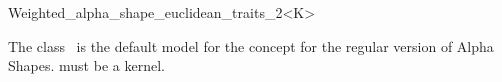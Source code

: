 %
%
%
%
%
%
%
%
%
%
%



\begin{ccRefClass} {Weighted_alpha_shape_euclidean_traits_2<K>}


\ccDefinition

The class \ccRefName\ is the default  model for the concept
 for the regular version of Alpha Shapes.
 must be a kernel.


\ccRefines
{}


\ccIsModel
{}


\end{ccRefClass}

